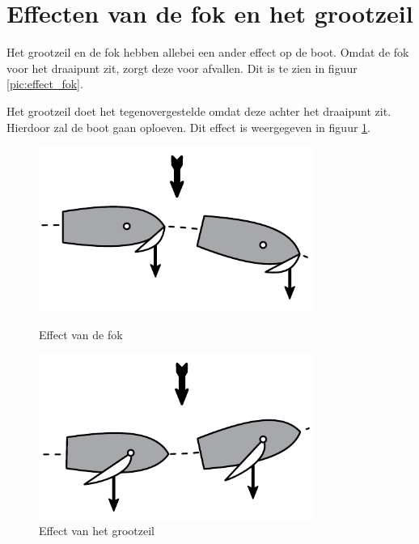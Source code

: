 \section{Effecten van de fok en het grootzeil}
Het grootzeil en de fok hebben allebei een ander effect op de boot. Omdat de fok voor het draaipunt zit, zorgt deze voor afvallen. Dit is te zien in figuur \ref{pic:effect_fok}.

Het grootzeil doet het tegenovergestelde omdat deze achter het draaipunt zit. Hierdoor zal de boot gaan oploeven. Dit effect is weergegeven in figuur \ref{pic:effect_grootzeil}.
\begin{figure}[ht]
  \centering
  \begin{minipage}[b]{0.49\textwidth}
  \centering
    \includegraphics[width=0.8\textwidth]{../Hoofdstukken/Krachten/pdf/effect_fok.pdf}
    \caption{Effect van de fok}
    \label{pic:effect_fok}
  \end{minipage}
  \hfill
  \begin{minipage}[b]{0.49\textwidth}
    \centering
    \includegraphics[width=0.8\textwidth]{../Hoofdstukken/Krachten/pdf/effect_grootzeil.pdf}
    \caption{Effect van het grootzeil}
    \label{pic:effect_grootzeil}
    \end{minipage}
\end{figure}
